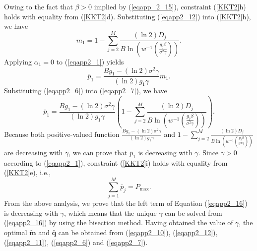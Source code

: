 \documentclass[journal]{IEEEtran}
\begin{document}
Owing to the fact that $\beta>0$ implied by (\ref{eqapp_2_15}), constraint (\ref{KKT2}h) holds with equality from (\ref{KKT2}d).
Substituting (\ref{eqapp2_12}) into (\ref{KKT2}h), we have
\begin{equation}\label{eqapp2_6}
m_1= 1- \sum_{j=2}^M \frac{{(\ln2)} D_j}{{B} \ln\left(w^{-1}\left(\frac{g_j \beta }{\sigma^2 \gamma}\right)\right)}.
\end{equation}
Applying $\alpha_1=0$ to (\ref{eqapp2_1}) yields
\begin{equation}\label{eqapp2_7}
\bar p_1=\frac{Bg_1-(\ln2) \sigma^2 \gamma}{(\ln2)g_1\gamma}m_1.
\end{equation}
Substituting (\ref{eqapp2_6}) into (\ref{eqapp2_7}), we have
\begin{equation}\label{eqapp2_13}
\bar p_1=\frac{Bg_1-(\ln2) \sigma^2 \gamma}{(\ln2)g_1\gamma} \left(
1- \sum_{j=2}^M \frac{{(\ln2)} D_j}{{B} \ln\left(w^{-1}\left(\frac{g_j \beta }{\sigma^2 \gamma}\right)\right)}
\right).
\end{equation}
Because both positive-valued function $\frac{Bg_1-(\ln2) \sigma^2 \gamma}{(\ln2)g_1\gamma}$  and $
1- \sum_{j=2}^M \frac{{(\ln2)} D_j}{{B} \ln\left(w^{-1}\left(\frac{g_j \beta }{\sigma^2 \gamma}\right)\right)}
$ are decreasing with $\gamma$, we can prove that $\bar p_1$ is decreasing with $\gamma$.
Since $\gamma>0$ according to (\ref{eqapp2_1}), constraint (\ref{KKT2}i) holds with equality from (\ref{KKT2}e), i.e.,
\begin{equation}\label{eqapp2_16}
 \sum_{j=1}^M \bar p_j=P_{\max}.
\end{equation}
From the above analysis, we prove that the left term of Equation (\ref{eqapp2_16}) is decreasing with $\gamma$, which means that the unique $\gamma$ can be solved from (\ref{eqapp2_16}) by using the bisection method.
Having obtained the value of $\gamma$, the optimal $\pmb {\tilde m }$ and $\pmb {\bar q}$ can be obtained from (\ref{eqapp2_10}), (\ref{eqapp2_12}), (\ref{eqapp2_11}), (\ref{eqapp2_6}) and (\ref{eqapp2_7}).

\end{document}
